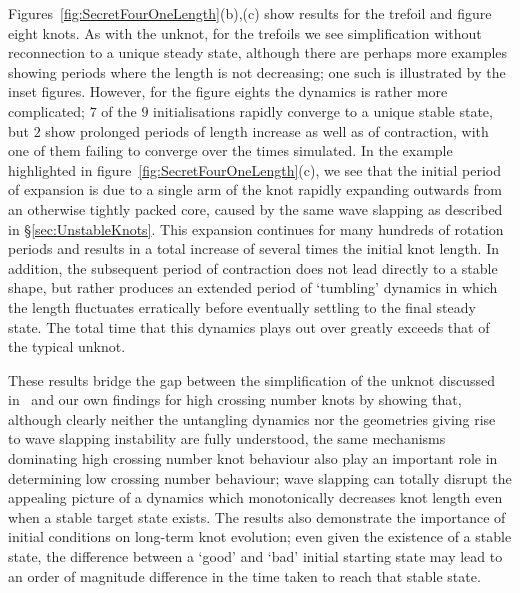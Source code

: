 Figures~\ref{fig:SecretFourOneLength}(b),(c) show results for the trefoil and figure eight knots. As with the unknot, for the trefoils we see simplification without reconnection to a unique steady state, although there are perhaps more examples showing periods where the length is not decreasing; one such is illustrated by the inset figures. However, for the figure eights the dynamics is rather more complicated; $7$ of the $9$ initialisations rapidly converge to a unique stable state, but $2$ show prolonged periods of length increase as well as of contraction, with one of them failing to converge over the times simulated. In the example highlighted in figure~\ref{fig:SecretFourOneLength}(c), we see that the initial period of expansion is due to a single arm of the knot rapidly expanding outwards from an otherwise tightly packed core, caused by the same wave slapping as described in \S\ref{sec:UnstableKnots}. This expansion continues for many hundreds of rotation periods and results in a total increase of several times the initial knot length. In addition, the subsequent period of contraction does not lead directly to a stable shape, but rather produces an extended period of `tumbling' dynamics in which the length fluctuates erratically before eventually settling to the final steady state. The total time that this dynamics plays out over greatly exceeds that of the typical unknot. 

These results bridge the gap between the simplification of the unknot discussed in~\citep{Maucher2016} and our own findings for high crossing number knots by showing that, although clearly neither the untangling dynamics nor the geometries giving rise to wave slapping instability are fully understood, the same mechanisms dominating high crossing number knot behaviour also play an important role in determining low crossing number behaviour; wave slapping can totally disrupt the appealing picture of a dynamics which monotonically decreases knot length even when a stable target state exists. The results also demonstrate the importance of initial conditions on long-term knot evolution; even given the existence of a stable state, the difference between a `good' and `bad' initial starting state may lead to an order of magnitude difference in the time taken to reach that stable state. 

